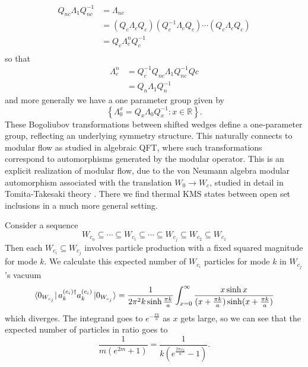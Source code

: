 \documentclass[12pt,a4paper]{article}
\begin{document}
\begin{equation}
  \begin{array}{ll}    
    Q_{nc} \Lambda_1 Q_{nc}^{-1}  &= \Lambda_{nc} \\
         &= \left(Q_c \Lambda_{c} Q_c\right) \left( Q_c^{-1} \Lambda_{c} Q_c\right) \cdots \left(Q_c \Lambda_{c} Q_c\right) \\
  &= Q_c \Lambda_c^n Q_c^{-1} \\
  \end{array}
\end{equation}
so that
\begin{equation}
  \begin{array}{ll}
  \Lambda_c^n &= Q_c^{-1} Q_{nc} \Lambda_1 Q_{nc}^{-1} Q{c} \\
  &= Q_n \Lambda_1 Q_n^{-1}
  \end{array}
\end{equation}
and more generally we have a one parameter group given by
\begin{equation}
  \left\{\Lambda_0^x = Q_x \Lambda_0 Q_x^{-1} : x \in \mathbb{R} \right\}.
\end{equation}
These Bogoliubov transformations between shifted wedges define a one-parameter group, reflecting an underlying symmetry structure. This naturally connects to modular flow as studied in algebraic QFT, where such transformations correspond to automorphisms generated by the modular operator. This is an explicit realization of modular flow, due to the von Neumann algebra modular automorphism associated with the translation $W_0 \rightarrow W_c$, studied in detail in Tomita-Takesaki theory \cite{Borchers2000}.  There we find thermal KMS states between open set inclusions in a much more general setting.


Consider a sequence
\begin{equation}
  W_{c_n} \subseteq \cdots \subseteq W_{c_i} \subseteq \cdots \subseteq W_{c_j} \subseteq W_{c_2} \subseteq W_{c_1}
\end{equation}
Then each $W_{c_i} \subseteq W_{c_j}$ involves particle production with a fixed squared magnitude for mode $k$.  We calculate this expected number of $W_{c_i}$ particles for mode $k$ in $W_{c_j}$'s vacuum
\begin{equation}
  \bra{0_{W_{c_j}}} a^{(c_i)\dagger}_k a^{(c_i)}_k \ket{0_{W_{c_j}}} = \frac{1}{2 \pi^2 k \sinh \frac{\pi k}{a}} \int_{x=0}^\infty \frac{x \sinh x}{(x+\frac{\pi k}{a}) \sinh(x+\frac{\pi k}{a})}
\end{equation}
which diverges.  The integrand goes to $e^{-\frac{\pi k}{a}}$ as $x$ gets large, so we can see that the expected number of particles in ratio goes to
\begin{equation}
  \frac{1}{m (e^{2m} + 1)} = \frac{1}{k (e^{\frac{2\pi \omega_k}{a}} - 1)}.
\end{equation}
\end{document}
